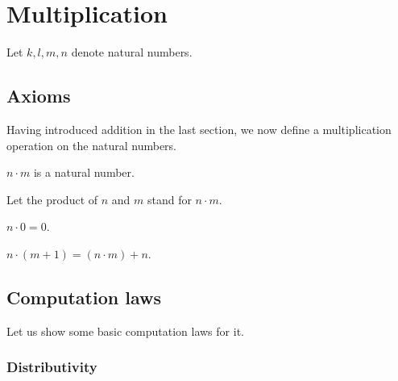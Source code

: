 \documentclass[../../arithmetic.ftl.tex]{subfiles}
\begin{document}
  \section{Multiplication}

  \begin{forthel}
  \end{forthel}

  \begin{forthel}
    Let $k, l, m, n$ denote natural numbers.
  \end{forthel}


  \subsection{Axioms}

  Having introduced addition in the last section, we now define a multiplication
  operation on the natural numbers.

  \begin{forthel}
    \begin{signature}
      $n \cdot m$ is a natural number.
    \end{signature}

    Let the product of $n$ and $m$ stand for $n \cdot m$.

    \begin{axiom}\label{Arithmetic_01_03_374176}
      $n \cdot 0 = 0$.
    \end{axiom}

    \begin{axiom}\label{Arithmetic_01_03_667207}
      $n \cdot (m + 1) = (n \cdot m) + n$.
    \end{axiom}
  \end{forthel}


  \subsection{Computation laws}

  Let us show some basic computation laws for it.


  \subsubsection*{Distributivity}
\end{document}
